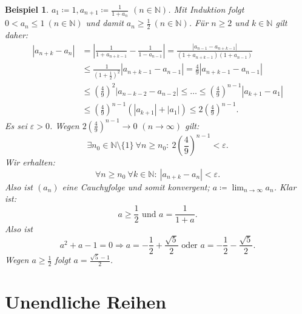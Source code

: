\documentclass[12pt]{extreport} %
\newcommand{\N}{\mathbb{N}}
\theoremstyle{named}
\theoremstyle{itshape}
\theoremstyle{normal}
\newtheorem*{beispiel*}{Beispiel}
\begin{document}
\begin{beispiel*}
	$a_{1} \coloneqq 1, a_{n+1} \coloneqq \frac{1}{1 + a_{n}}$ $(n \in \N)$. Mit Induktion folgt $0 < a_{n} \leq 1 ~(n \in \N)$ und damit $a_{n} \geq \frac{1}{2} ~(n \in \N)$.	
	Für $n \geq 2$ und $k \in \N$ gilt daher:
	\begin{align*}
		|a_{n+k} - a_{n} | & = \left| \frac{1}{1+a_{n+k-1}} - \frac{1}{1 - a_{n - 1}} \right| = \frac{|a_{n-1} - a_{n +k-1}|}{(1+a_{n+k-1})(1+a_{n-1})} \\
			& \leq \frac{1}{(1+\frac{1}{2})^{2}} |a_{n+k-1} - a_{n-1}| = \frac{4}{9} |a_{n+k-1} - a_{n-1}| \\
			& \leq \left(\frac{4}{9} \right)^{2} |a_{n-k-2} - a_{n-2}| \leq \dotsc \leq \left( \frac{4}{9} \right)^{n-1} |a_{k+1} - a_{1}| \\
			& \leq \left( \frac{4}{9} \right)^{n-1} \left( |a_{k+1}| + |a_{1}|\right) \leq 2 \left( \frac{4}{9} \right)^{n-1} .
	\end{align*}
	Es sei $\varepsilon > 0$. Wegen $2 \left( \frac{4}{9} \right)^{n-1} \to 0$ $(n \to \infty)$ gilt: 
	$$\exists n_{0} \in \N\setminus \{ 1 \} ~ \forall n \geq n_{0}: ~ 2\left(\frac{4}{9}\right)^{n-1} < \varepsilon.$$
	Wir erhalten:
		$$\forall n \geq n_{0} ~ \forall k \in \N: ~ |a_{n+k} - a_{n}| < \varepsilon. $$
	Also ist $(a_{n})$ eine Cauchyfolge und somit konvergent; $a \coloneqq \lim_{n \rightarrow \infty} a_{n}$. Klar ist: 
	$$ a \geq \frac{1}{2} \text{ und } a = \frac{1}{1 + a}.$$
	Also ist 
	$$a^{2} + a - 1 = 0 \Rightarrow a = - \frac{1}{2} + \frac{\sqrt{5}}{2} \text{ oder } a = - \frac{1}{2} - \frac{\sqrt{5}}{2}.$$ 
	Wegen $a \geq \frac{1}{2}$ folgt $a = \frac{\sqrt{5} - 1}{2}$.
\end{beispiel*}


\newpage


\chapter{Unendliche Reihen}
\end{document}
